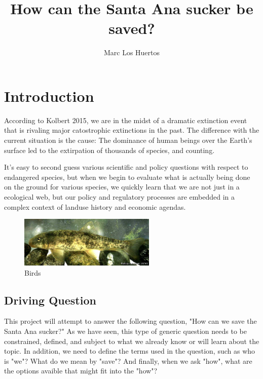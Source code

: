 \documentclass{article}\usepackage[]{graphicx}\usepackage[]{color}
\title{How can the Santa Ana sucker be saved?}
\author{Marc Los Huertos}
\begin{document}
\maketitle

\section{Introduction}

According to Kolbert 2015, we are in the midst of a dramatic extinction event that is rivaling major catostrophic extinctions in the past. The difference with the current situation is the cause: The dominance of human beings over the Earth's surface led to the extirpation of thousands of species, and counting. 

It's easy to second guess various scientific and policy questions with respect to endangered species, but when we begin to evaluate what is actually being done on the ground for various species, we quickly learn that we are not just in a ecological web, but our policy and regulatory processes are embedded in a complex context of landuse history and economic agendas.  

\begin{figure}
  \begin{center}
    \includegraphics[width=0.58\textwidth]{Catostomus_santaanae.jpg}
  \end{center}
  \caption{Birds}
\end{figure}


\subsection{Driving Question}

This project will attempt to answer the following question, "How can we save the Santa Ana sucker?" As we have seen, this type of generic question needs to be constrained, defined, and subject to what we already know or will learn about the topic. In addition, we need to define the terms used in the question, such as who is "we"? What do we mean by "save"?  And finally, when we ask "how", what are the options avaible that might fit into the "how"? 
\end{document}
